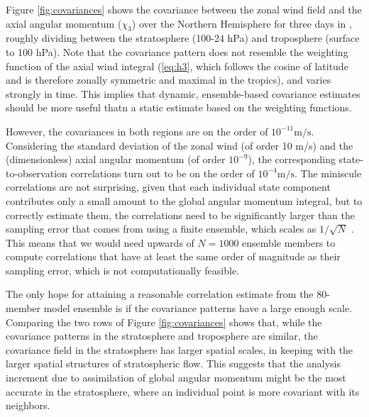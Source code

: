 Figure \ref{fig:covariances} shows the covariance between the zonal wind field and the axial angular momentum ($\chi_3$) over the Northern Hemisphere for three days in \ERPALL, roughly dividing between the 
stratosphere (100-24 hPa) 
and
troposphere (surface to 100 hPa).
Note that the covariance pattern does not resemble the weighting function of the axial wind integral (\ref{eq:h3}, which follows the cosine of latitude and is therefore zonally symmetric and maximal in the tropics), and varies strongly in time. 
This implies that dynamic, ensemble-based covariance estimates should be more useful thatn a static estimate based on the weighting functions.

However, the covariances in both regions are on the order of $10^{-11}\text{m/s}$.  
Considering the standard deviation of the zonal wind (of order 10 m/s) and the (dimensionless) axial angular momentum (of order $10^{-9}$), the corresponding state-to-observation correlations turn out to be on the order of $10^{-4}\text{m/s}$. 
The miniscule correlations are not surprising, given that each individual state component contributes only a small amount to the global angular momentum integral, but to 
correctly estimate them, the correlations need to be significantly larger than the sampling error that comes from using a finite ensemble, which 
scales as $1/\sqrt{N}$ \citep{Houtekamer1998}. 
This means that we would need upwards of $N=1000$ ensemble members to compute correlations that have at least the same order of magnitude as their sampling error, which is not computationally feasible. 

The only hope for attaining a reasonable correlation estimate from the 80-member model ensemble is if the covariance patterns have a large enough scale.  
Comparing the two rows of Figure \ref{fig:covariances} shows that, while
the covariance patterns in the stratosphere and troposphere are similar, the covariance field in the stratosphere has larger spatial scales, in keeping with the larger spatial structures of stratospheric flow.
This suggests that the analysis increment due to assimilation of global angular momentum might be the most accurate in the stratosphere, where an individual point is more covariant with its neighbors.  

